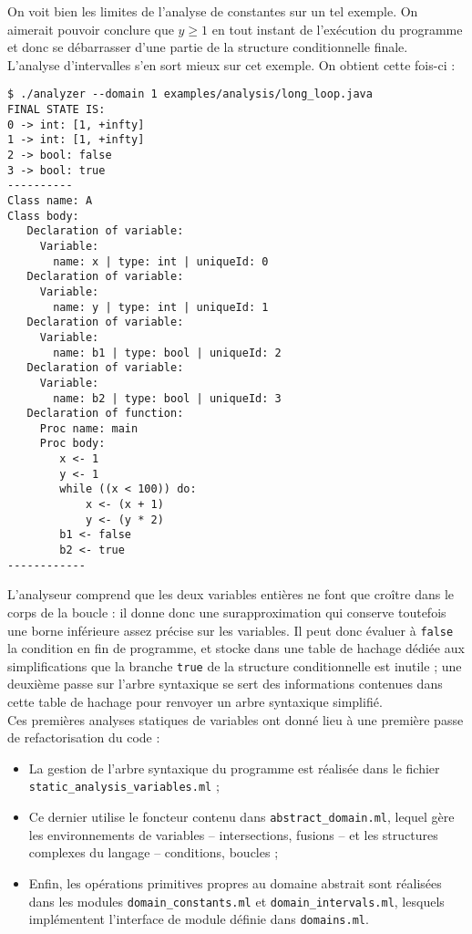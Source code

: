 \documentclass[paper=a4, fontsize=11pt]{scrartcl}
\numberwithin{figure}{section}			%
\numberwithin{table}{section}				%
\begin{document}
On voit bien les limites de l'analyse de constantes sur un tel exemple. On aimerait pouvoir conclure que $y \geq 1$ en tout instant de l'exécution du programme et donc se débarrasser d'une partie de la structure conditionnelle finale.\\

L'analyse d'intervalles s'en sort mieux sur cet exemple. On obtient cette fois-ci :
\begin{verbatim}
$ ./analyzer --domain 1 examples/analysis/long_loop.java
FINAL STATE IS:
0 -> int: [1, +infty]
1 -> int: [1, +infty]
2 -> bool: false
3 -> bool: true
----------
Class name: A
Class body:
   Declaration of variable:
     Variable:
       name: x | type: int | uniqueId: 0
   Declaration of variable:
     Variable:
       name: y | type: int | uniqueId: 1
   Declaration of variable:
     Variable:
       name: b1 | type: bool | uniqueId: 2
   Declaration of variable:
     Variable:
       name: b2 | type: bool | uniqueId: 3
   Declaration of function:
     Proc name: main
     Proc body:
        x <- 1
        y <- 1
        while ((x < 100)) do:
            x <- (x + 1)
            y <- (y * 2)
        b1 <- false
        b2 <- true
------------
\end{verbatim}

L'analyseur comprend que les deux variables entières ne font que croître dans le corps de la boucle : il donne donc une surapproximation qui conserve toutefois une borne inférieure assez précise sur les variables. Il peut donc évaluer à \texttt{false} la condition en fin de programme, et stocke dans une table de hachage dédiée aux simplifications que la branche \texttt{true} de la structure conditionnelle est inutile ; une deuxième passe sur l'arbre syntaxique se sert des informations contenues dans cette table de hachage pour renvoyer un arbre syntaxique simplifié.\\

Ces premières analyses statiques de variables ont donné lieu à une première passe de refactorisation du code :

\begin{itemize}
\item La gestion de l'arbre syntaxique du programme est réalisée dans le fichier \newline \texttt{static\_analysis\_variables.ml} ;
\item Ce dernier utilise le foncteur contenu dans \texttt{abstract\_domain.ml}, lequel gère les environnements de variables -- intersections, fusions -- et les structures complexes du langage -- conditions, boucles ;
\item Enfin, les opérations primitives propres au domaine abstrait sont réalisées dans les modules \texttt{domain\_constants.ml} et \texttt{domain\_intervals.ml}, lesquels implémentent l'interface de module définie dans \texttt{domains.ml}.
\end{itemize}
\end{document}
